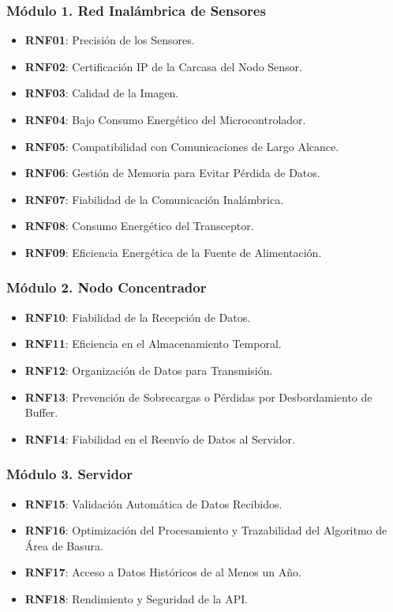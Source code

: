 \subsubsection*{Módulo 1. Red Inalámbrica de Sensores}
\begin{itemize}
    \item \textbf{RNF01}: Precisión de los Sensores.
    \item \textbf{RNF02}: Certificación IP de la Carcasa del Nodo Sensor.
    \item \textbf{RNF03}: Calidad de la Imagen.
    \item \textbf{RNF04}: Bajo Consumo Energético del Microcontrolador.
    \item \textbf{RNF05}: Compatibilidad con Comunicaciones de Largo Alcance.
    \item \textbf{RNF06}: Gestión de Memoria para Evitar Pérdida de Datos.
    \item \textbf{RNF07}: Fiabilidad de la Comunicación Inalámbrica.
    \item \textbf{RNF08}: Consumo Energético del Transceptor.
    \item \textbf{RNF09}: Eficiencia Energética de la Fuente de Alimentación.
\end{itemize}

\subsubsection*{Módulo 2. Nodo Concentrador}
\begin{itemize}
    \item \textbf{RNF10}: Fiabilidad de la Recepción de Datos.
    \item \textbf{RNF11}: Eficiencia en el Almacenamiento Temporal.
    \item \textbf{RNF12}: Organización de Datos para Transmisión.
    \item \textbf{RNF13}: Prevención de Sobrecargas o Pérdidas por Desbordamiento de Buffer.
    \item \textbf{RNF14}: Fiabilidad en el Reenvío de Datos al Servidor.
\end{itemize}

\subsubsection*{Módulo 3. Servidor}
\begin{itemize}
    \item \textbf{RNF15}: Validación Automática de Datos Recibidos.
    \item \textbf{RNF16}: Optimización del Procesamiento y Trazabilidad del Algoritmo de Área de Basura.
    \item \textbf{RNF17}: Acceso a Datos Históricos de al Menos un Año.
    \item \textbf{RNF18}: Rendimiento y Seguridad de la API.
\end{itemize}


